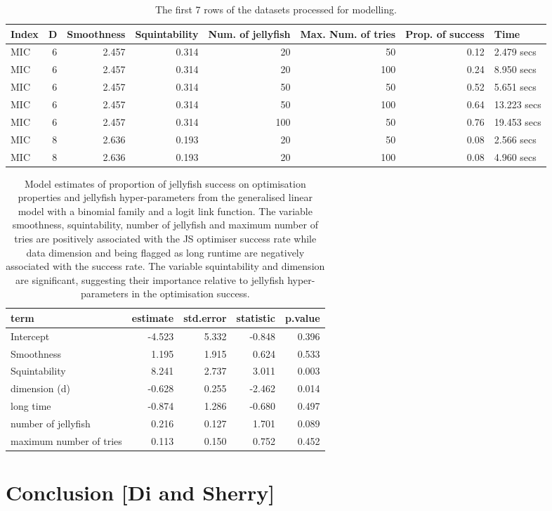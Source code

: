 \documentclass[
  number,
  preprint,
  3p]{elsarticle}
\begin{document}
\begingroup\fontsize{7}{9}\selectfont

\hypertarget{tbl-mod-data}{}
\begin{longtable}[t]{lrrrrrrl}
\caption{\label{tbl-mod-data}The first 7 rows of the datasets processed for modelling. }\tabularnewline

\toprule
Index & D & Smoothness & Squintability & Num. of jellyfish & Max. Num. of tries & Prop. of success & Time\\
\midrule
MIC & 6 & 2.457 & 0.314 & 20 & 50 & 0.12 & 2.479 secs\\
MIC & 6 & 2.457 & 0.314 & 20 & 100 & 0.24 & 8.950 secs\\
MIC & 6 & 2.457 & 0.314 & 50 & 50 & 0.52 & 5.651 secs\\
MIC & 6 & 2.457 & 0.314 & 50 & 100 & 0.64 & 13.223 secs\\
MIC & 6 & 2.457 & 0.314 & 100 & 50 & 0.76 & 19.453 secs\\
\addlinespace
MIC & 8 & 2.636 & 0.193 & 20 & 50 & 0.08 & 2.566 secs\\
MIC & 8 & 2.636 & 0.193 & 20 & 100 & 0.08 & 4.960 secs\\
\bottomrule
\end{longtable}
\endgroup{}

\begingroup\fontsize{7}{9}\selectfont

\hypertarget{tbl-mod-output}{}
\begin{longtable}[t]{|>{}lrrr>{}r|}
\caption{\label{tbl-mod-output}Model estimates of proportion of jellyfish success on optimisation
properties and jellyfish hyper-parameters from the generalised linear
model with a binomial family and a logit link function. The variable
smoothness, squintability, number of jellyfish and maximum number of
tries are positively associated with the JS optimiser success rate while
data dimension and being flagged as long runtime are negatively
associated with the success rate. The variable squintability and
dimension are significant, suggesting their importance relative to
jellyfish hyper-parameters in the optimisation success. }\tabularnewline

\toprule
term & estimate & std.error & statistic & p.value\\
\midrule
Intercept & -4.523 & 5.332 & -0.848 & 0.396\\
Smoothness & 1.195 & 1.915 & 0.624 & 0.533\\
Squintability & 8.241 & 2.737 & 3.011 & 0.003\\
dimension (d) & -0.628 & 0.255 & -2.462 & 0.014\\
long time & -0.874 & 1.286 & -0.680 & 0.497\\
\addlinespace
number of jellyfish & 0.216 & 0.127 & 1.701 & 0.089\\
maximum number of tries & 0.113 & 0.150 & 0.752 & 0.452\\
\bottomrule
\end{longtable}
\endgroup{}

\hypertarget{sec-conclusion}{%
\section{Conclusion {[}Di and Sherry{]}}\label{sec-conclusion}}


\renewcommand\refname{References}
  
\end{document}

